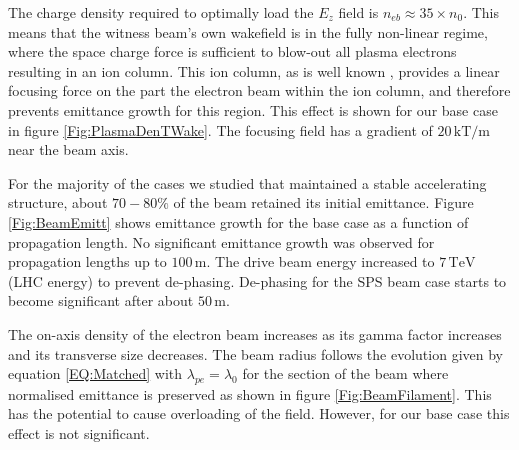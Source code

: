 \documentclass[aps,prstab,reprint,amsmath,amssymb,groupedaddress]{revtex4-1}
\newcommand{\unit}[1]{\,\mathrm{#1}}
\begin{document}
The charge density required to optimally load the $E_{z}$ field is $n_{eb} \approx 35\times n_{0}$. This means that the
witness beam's own wakefield is in the fully non-linear regime, where the space charge force is sufficient to blow-out
all plasma electrons resulting in an ion column. This ion column, as is well known \cite{rosenzweig:1991}, provides a
linear focusing force on the part the electron beam within the ion column, and therefore prevents emittance growth for
this region. This effect is shown for our base case in figure \ref{Fig:PlasmaDenTWake}. The focusing field has a
gradient of $20\unit{kT/m}$ near the beam axis.



For the majority of the cases we studied that maintained a stable accelerating structure, about $70-80\%$ of the beam
retained its initial emittance. Figure \ref{Fig:BeamEmitt} shows emittance growth for the base case as a function of
propagation length. No significant emittance growth was observed for propagation lengths up to $100\unit{m}$. The drive
beam energy increased to $7\unit{TeV}$ (LHC energy) to prevent de-phasing. De-phasing for the SPS beam case starts to
become significant after about $50\unit{m}$.

The on-axis density of the electron beam increases as its gamma factor increases and its transverse size decreases. The
beam radius follows the evolution given by equation \ref{EQ:Matched} with $\lambda_{pe} = \lambda_{0}$ for the section
of the beam where normalised emittance is preserved as shown in figure \ref{Fig:BeamFilament}. This has the potential to
cause overloading of the field. However, for our base case this effect is not significant.
\end{document}
